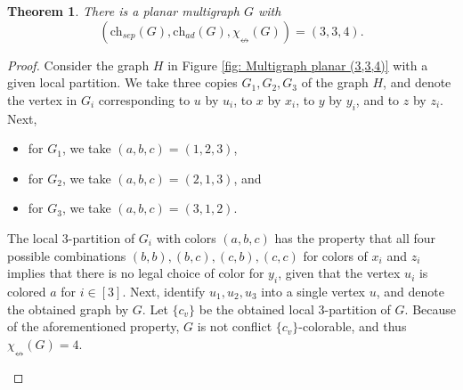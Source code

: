 \documentclass[12pt]{article}
\newtheorem{theorem}{Theorem}[section]
\newcommand{\chsep}{\mathrm{ch}_{sep}}
\newcommand{\chad}{\mathrm{ch}_{ad}}
\newcommand{\sing}{\chi_{\nleftrightarrow}}
\begin{document}
\begin{theorem} 
\label{Proposition: Multigraph planar (3,3,4)}
    There is a planar multigraph $G$ with 
    $$
    (\chsep(G), \chad(G), \sing(G))=(3,3,4).
    $$
\end{theorem}
\begin{proof}
Consider the graph $H$ in Figure \ref{fig: Multigraph planar (3,3,4)} with
a given local partition. We 
take three copies $G_1, G_2, G_3$ of the graph $H$, and denote the 
vertex in $G_i$
corresponding to $u$ by $u_i$, to $x$ by $x_i$, to $y$ by $y_i$, 
and to $z$ by $z_i$.
Next,
\begin{itemize}
    \item for $G_1$, we take $(a,b,c)=(1,2,3)$,
    \item for $G_2$, we take $(a,b,c)=(2,1,3)$, and
    \item for $G_3$, we take $(a,b,c)=(3,1,2)$.
\end{itemize}
The local $3$-partition of $G_i$ with colors $(a,b,c)$ has the property 
that all four possible combinations $(b,b),(b,c),(c,b),(c,c)$ for 
colors of $x_i$ and $z_i$ implies that there is no legal
choice of color for $y_i$, given that the vertex $u_i$ is colored $a$ 
for $i\in [3]$. Next, identify $u_1, u_2, u_3$ into a single vertex 
$u$, and denote the obtained graph by $G$. Let $\{c_v\}$ be the 
obtained local $3$-partition of $G$. Because of the aforementioned
property, $G$ 
is not conflict $\{c_v\}$-colorable, and thus $\sing(G)=4$. 
\begin{figure}
    \centering
\end{figure}
\end{proof}
\end{document}

